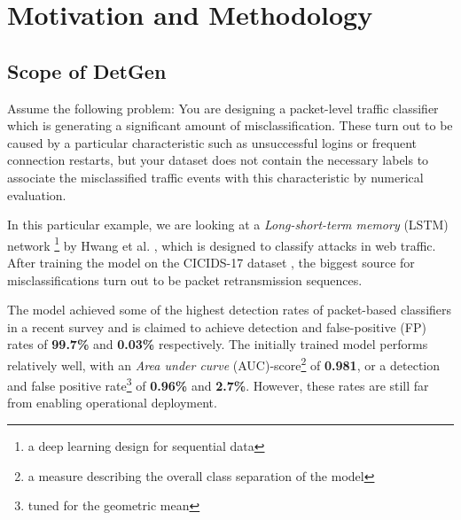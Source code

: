 \documentclass[runningheads]{llncs}
\begin{document}
\section{Motivation and Methodology}\label{Sec:Motivation}




\subsection{Scope of DetGen}
\label{Sec:Improvedtrafficsep}


Assume the following problem: You are designing a packet-level traffic classifier which is generating a significant amount of misclassification. These turn out to be caused by a particular characteristic such as unsuccessful logins or frequent connection restarts, but your dataset does not contain the necessary labels to associate the misclassified traffic events with this characteristic by numerical evaluation.

In this particular example, we are looking at a \textit{Long-short-term memory} (LSTM) network \footnote{a deep learning design for sequential data} by Hwang et al. \cite{hwang2019lstm}, which is designed to classify attacks in web traffic. After training the model on the CICIDS-17 dataset \cite{sharafaldin2018toward}, the biggest source for misclassifications turn out to be packet retransmission sequences. 


The model achieved some of the highest detection rates of packet-based classifiers in a recent survey \cite{tahaei2020rise} and is claimed to achieve detection and false-positive (FP) rates of \textbf{99.7\%} and \textbf{0.03\%} respectively.
The initially trained model performs relatively well, with an \textit{Area under curve} (AUC)-score\footnote{a measure describing the overall class separation of the model} of \textbf{0.981}, or a detection and false positive rate\footnote{tuned for the geometric mean} of \textbf{0.96\%} and \textbf{2.7\%}. However, these rates are still far from enabling operational deployment. 
\end{document}
